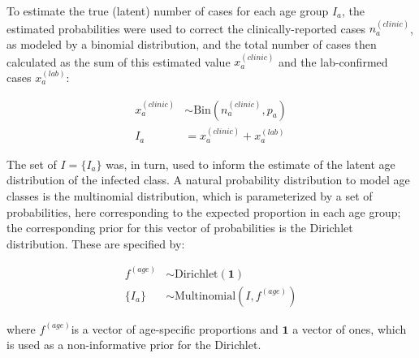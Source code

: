 To estimate the true (latent) number of cases for each age group \(I_a\), the estimated probabilities were used to correct the clinically-reported cases \(n_a^{(clinic)}\), as modeled by a binomial distribution, and the total number of cases then calculated as the sum of this estimated value \(x_a^{(clinic)}\) and the lab-confirmed cases \(x_a^{(lab)}\):

\begin{equation}
\begin{aligned}
x_a^{(clinic)} &\sim \text{Bin}(n_a^{(clinic)},p_a) \\
I_a &= x_a^{(clinic)}+x_a^{(lab)}
\end{aligned}
\end{equation}

The set of \(I = \{I_a\}\) was, in turn, used to inform the estimate of the latent age distribution of the infected class. A natural probability distribution to model age classes is the multinomial distribution, which is parameterized by a set of probabilities, here corresponding to the expected proportion in each age group; the corresponding prior for this vector of probabilities is the  Dirichlet distribution. These are specified by:

\begin{equation}
\begin{aligned}
f^{(age)} &\sim \text{Dirichlet}(\mathbf{1}) \\
\{I_a\} &\sim \text{Multinomial}(I, f^{(age)})
\end{aligned}
\end{equation}

where \(f^{(age)}\)is a vector of age-specific proportions and \(\mathbf{1}\) a vector of ones, which is used as a non-informative prior for the Dirichlet.